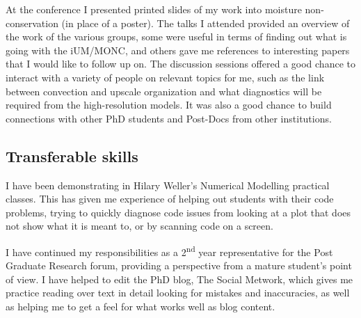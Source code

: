 \documentclass[11pt,a4paper]{article}
\newcommand{\ts}{\textsuperscript}
\begin{document}
At the conference I presented printed slides of my work into moisture non-conservation (in place of a poster). The talks I attended provided an overview of the work of the various groups, some were useful in terms of finding out what is going with the iUM/MONC, and others gave me references to interesting papers that I would like to follow up on. The discussion sessions offered a good chance to interact with a variety of people on relevant topics for me, such as the link between convection and upscale organization and what diagnostics will be required from the high-resolution models. It was also a good chance to build connections with other PhD students and Post-Docs from other institutions.


\label{sec:Training record}
\subsection{Transferable skills}
I have been demonstrating in Hilary Weller's Numerical Modelling practical classes. This has given me experience of helping out students with their code problems, trying to quickly diagnose code issues from looking at a plot that does not show what it is meant to, or by scanning code on a screen. %

I have continued my responsibilities as a 2\ts{nd} year representative for the Post Graduate Research forum, providing a perspective from a mature student's point of view. I have helped to edit the PhD blog, The Social Metwork, which gives me practice reading over text in detail looking for mistakes and inaccuracies, as well as helping me to get a feel for what works well as blog content. 
\end{document}

